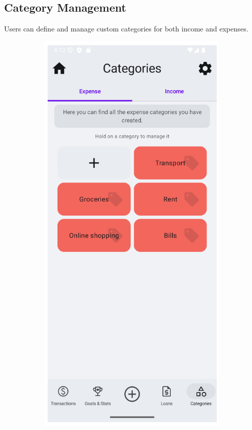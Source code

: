 \documentclass[a4paper,12pt]{article}
\begin{document}
\subsection{Category Management}
Users can define and manage custom categories for both income and expenses.

\begin{figure}[H]
    \centering
    \begin{subfigure}[b]{0.23\textwidth}
        \includegraphics[width=\textwidth]{categories_expense.png}

\end{subfigure}
\end{figure}
\end{document}

